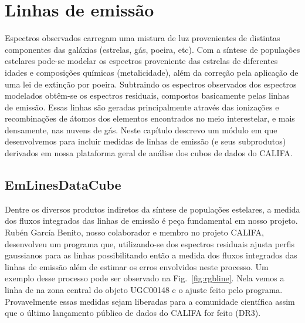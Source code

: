 


\chapter{Linhas de emissão}
\label{sec:emlines}

Espectros observados carregam uma mistura de luz provenientes de distintas componentes das galáxias
(estrelas, gás, poeira, etc). Com a síntese de populações estelares pode-se modelar os espectros
proveniente das estrelas de diferentes idades e composições químicas (metalicidade), além da
correção pela aplicação de uma lei de extinção por poeira. Subtraindo os espectros observados dos
espectros modelados obtêm-se os espectros residuais, compostos basicamente pelas linhas de emissão.
Essas linhas são geradas principalmente através das ionizações e recombinações de átomos dos
elementos encontrados no meio interestelar, e mais densamente, nas nuvens de gás. Neste capítulo
descrevo um módulo em \pyt que desenvolvemos para incluir medidas de linhas de emissão (e seus
subprodutos) derivados em nossa plataforma geral de análise dos cubos de dados do CALIFA.

\section{EmLinesDataCube}
\label{sec:emline:datacube}

Dentre os diversos produtos indiretos da síntese de populações estelares, a medida dos fluxos
integrados das linhas de emissão é peça fundamental em nosso projeto. Rubén García Benito, nosso
colaborador e membro no projeto CALIFA, desenvolveu um programa que, utilizando-se dos espectros
residuais  ajusta perfis gaussianos para as linhas possibilitando então a medida dos fluxos
integrados das linhas de emissão além de estimar os erros envolvidos neste processo. Um exemplo
desse processo pode ser observado na Fig.\ \ref{fig:rgbline}. Nela vemos a linha de \Hbeta na zona
central do objeto UGC00148 e o ajuste feito pelo programa. Provavelmente essas medidas sejam
liberadas para a comunidade científica assim que o último lançamento público de dados do CALIFA for
feito (DR3).

